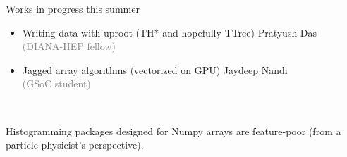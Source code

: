 \documentclass[aspectratio=169]{beamer}
\begin{document}
\begin{frame}{Works in progress this summer}
\large
\vspace{0.5 cm}
\begin{itemize}\setlength{\itemsep}{0.5 cm}
\item Writing data with uproot (TH* and hopefully TTree) \hfill Pratyush Das \\ \hfill \textcolor{gray}{\normalsize (DIANA-HEP fellow)}

\item Jagged array algorithms (vectorized on GPU) \hfill Jaydeep Nandi \\ \hfill \textcolor{gray}{\normalsize (GSoC student)}
\end{itemize}


\small
\vspace{0.25 cm}

\vspace{0.25 cm}
\mbox{ } \hfill {} \hfill \mbox{ }

\vspace{0.25 cm}
\hfill {}
\end{frame}

\begin{frame}{}
\Large
\vspace{1 cm}

Histogramming packages designed for Numpy arrays are feature-poor (from a particle physicist's perspective).

\begin{center}
\end{center}
\end{frame}
\end{document}

